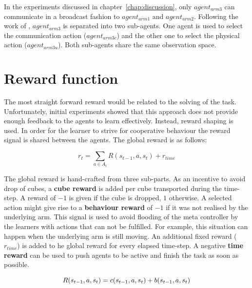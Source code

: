 
In the experiments discussed in chapter~\ref{chap:discussion}, only $agent_{arm3}$ can communicate in a broadcast fashion to $agent_{arm1}$ and $agent_{arm2}$. Following the work of \cite{foerster_learning_2016}, $agent_{arm3}$ is separated into two sub-agents. One agent is used to select the communication action ($agent_{arm3c}$) and the other one to select the physical action ($agent_{arm3u}$). Both sub-agents share the same observation space. 

\section{Reward function}
\label{sec:reward-function}

The most straight forward reward would be related to the solving of the task. Unfortunately, initial experiments showed that this approach does not provide enough feedback to the agents to learn effectively. Instead, reward shaping is used. In order for the learner to strive for cooperative behaviour the reward signal is shared between the agents. The global reward is as follows:

\begin{equation}
    r_{t} = \sum_{a \in A_t} R(s_{t-1}, a, s_t) + r_{time}
\end{equation}

The global reward is hand-crafted from three sub-parts. As an incentive to avoid drop of cubes, a \textbf{cube reward} is added per cube transported during the time-step. A reward of $-1$ is given if the cube is dropped, $1$ otherwise. A selected action might give rise to a \textbf{behaviour reward} of $-1$ if it was not realised by the underlying arm. This signal is used to avoid flooding of the meta controller by the learners with actions that can not be fulfilled. For example, this situation can happen when the underlying arm is still moving. An additional fixed reward ($r_{time}$) is added to he global reward for every elapsed time-step. A negative \textbf{time reward} can be used to push agents to be active and finish the task as soon as possible.

\begin{equation*}
    R(s_{t-1}, a, s_t) = c(s_{t-1}, a, s_t) + b(s_{t-1}, a, s_t)\\
\end{equation*}

